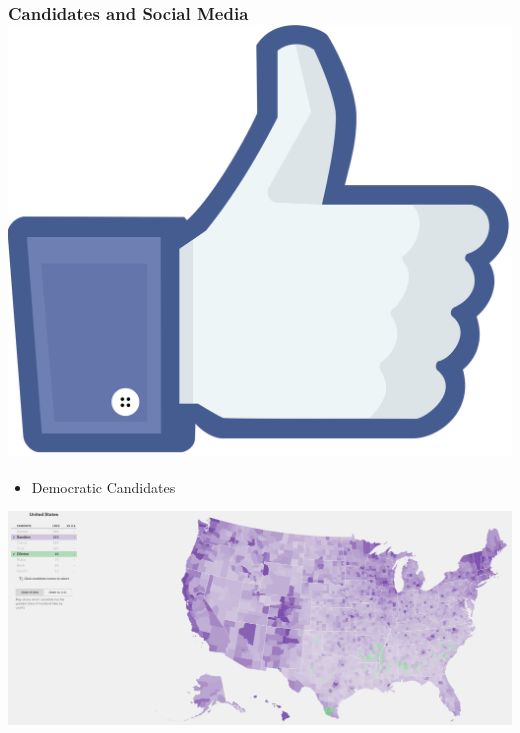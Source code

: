 \documentclass[xcolor=dvipsnames]{beamer}
\begin{document}
\begin{frame}
\frametitle{Candidates and Social Media  \hfill \includegraphics[scale=.015]{images/likes.png}}
\begin{itemize}
\item Democratic Candidates
\end{itemize}
\begin{center}

\includegraphics[scale=.14]{demmap.png}
\end{center}
\end{frame}
\end{document}
